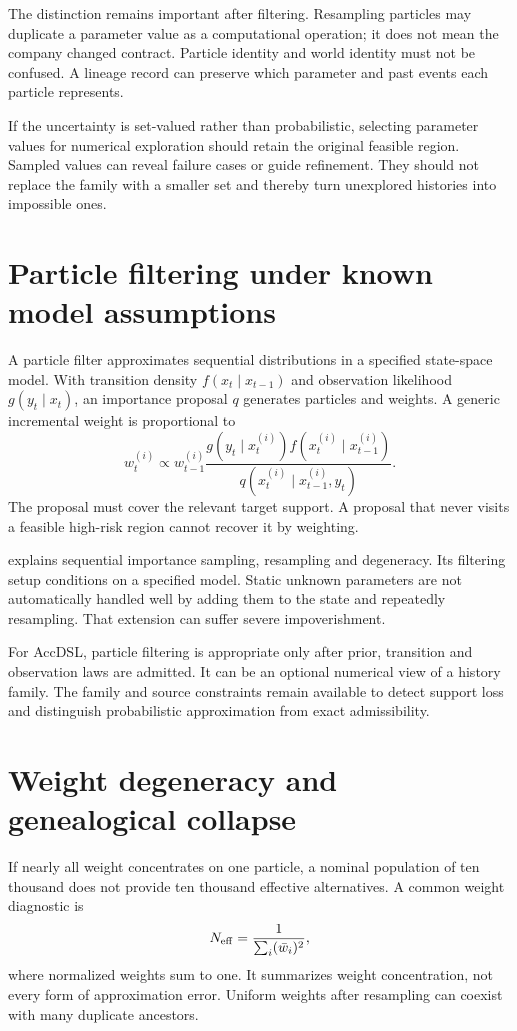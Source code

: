 The distinction remains important after filtering. Resampling particles may duplicate a parameter value as a computational operation; it does not mean the company changed contract. Particle identity and world identity must not be confused. A lineage record can preserve which parameter and past events each particle represents.

If the uncertainty is set-valued rather than probabilistic, selecting parameter values for numerical exploration should retain the original feasible region. Sampled values can reveal failure cases or guide refinement. They should not replace the family with a smaller set and thereby turn unexplored histories into impossible ones.

\section{Particle filtering under known model assumptions}
A particle filter approximates sequential distributions in a specified state-space model. With transition density $f(x_t\mid x_{t-1})$ and observation likelihood $g(y_t\mid x_t)$, an importance proposal $q$ generates particles and weights. A generic incremental weight is proportional to
\begin{equation}
 w_t^{(i)}\propto w_{t-1}^{(i)}\frac{g(y_t\mid x_t^{(i)})f(x_t^{(i)}\mid x_{t-1}^{(i)})}{q(x_t^{(i)}\mid x_{t-1}^{(i)},y_t)}.
\end{equation}
The proposal must cover the relevant target support. A proposal that never visits a feasible high-risk region cannot recover it by weighting.

\citet[Sections 2--3]{doucet2012tutorial} explains sequential importance sampling, resampling and degeneracy. Its filtering setup conditions on a specified model. Static unknown parameters are not automatically handled well by adding them to the state and repeatedly resampling. That extension can suffer severe impoverishment.

For AccDSL, particle filtering is appropriate only after prior, transition and observation laws are admitted. It can be an optional numerical view of a history family. The family and source constraints remain available to detect support loss and distinguish probabilistic approximation from exact admissibility.

\section{Weight degeneracy and genealogical collapse}
If nearly all weight concentrates on one particle, a nominal population of ten thousand does not provide ten thousand effective alternatives. A common weight diagnostic is
\begin{equation}
 N_{\rm eff}=\frac{1}{\sum_i(\bar w_i)^2},
\end{equation}
where normalized weights sum to one. It summarizes weight concentration, not every form of approximation error. Uniform weights after resampling can coexist with many duplicate ancestors.

